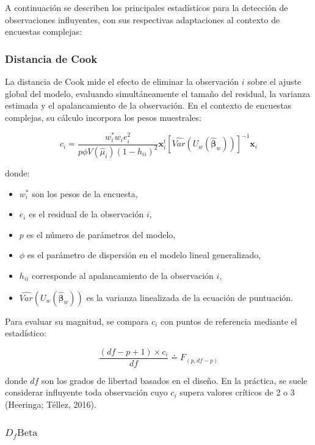\documentclass[
  spanish,
  12pt,
]{book}
\providecommand{\tightlist}{%
  \setlength{\itemsep}{0pt}\setlength{\parskip}{0pt}}
\begin{document}
A continuación se describen los principales estadísticos para la detección de observaciones influyentes, con sus respectivas adaptaciones al contexto de encuestas complejas:

\subsubsection{Distancia de Cook}\label{distancia-de-cook}

La distancia de Cook mide el efecto de eliminar la observación \(i\) sobre el ajuste global del modelo, evaluando simultáneamente el tamaño del residual, la varianza estimada y el apalancamiento de la observación. En el contexto de encuestas complejas, su cálculo incorpora los pesos muestrales:

\[
c_{i}=\frac{w_{i}^{*}w_{i}e_{i}^{2}}{p\phi V\left(\hat{\mu}_{i}\right)\left(1-h_{ii}\right)^{2}}\boldsymbol{x}_{i}^{t}\left[\widehat{Var}\left(U_{w}\left(\hat{\boldsymbol{\beta}}_{w}\right)\right)\right]^{-1}\boldsymbol{x}_{i}
\]

donde:

\begin{itemize}
\tightlist
\item
  \(w_i^*\) son los pesos de la encuesta,
\item
  \(e_i\) es el residual de la observación \(i\),
\item
  \(p\) es el número de parámetros del modelo,
\item
  \(\phi\) es el parámetro de dispersión en el modelo lineal generalizado,
\item
  \(h_{ii}\) corresponde al apalancamiento de la observación \(i\),
\item
  \(\widehat{Var}\left(U_{w}\left(\hat{\boldsymbol{\beta}}_{w}\right)\right)\) es la varianza linealizada de la ecuación de puntuación.
\end{itemize}

Para evaluar su magnitud, se compara \(c_i\) con puntos de referencia mediante el estadístico:

\[
\frac{\left(df-p+1\right)\times c_{i}}{df} \doteq F_{\left(p,df-p\right)}
\]

donde \(df\) son los grados de libertad basados en el diseño. En la práctica, se suele considerar influyente toda observación cuyo \(c_i\) supera valores críticos de 2 o 3 (Heeringa; Téllez, 2016).

\subsubsection{\texorpdfstring{\(D_f\text{Beta}\)}{D\_f\textbackslash text\{Beta\}}}\label{d_ftextbeta}
\end{document}
